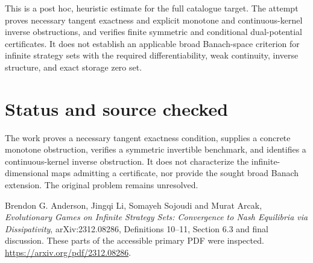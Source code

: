 \documentclass[11pt]{article}
\begin{document}
This is a post hoc, heuristic estimate for the full catalogue target.
The attempt proves necessary tangent exactness and explicit monotone and continuous-kernel inverse obstructions, and verifies finite symmetric and conditional dual-potential certificates. It does not establish an applicable broad Banach-space criterion for infinite strategy sets with the required differentiability, weak continuity, inverse structure, and exact storage zero set.

\section*{Status and source checked}
The work proves a necessary tangent exactness condition, supplies a concrete monotone obstruction, verifies a symmetric invertible benchmark, and identifies a continuous-kernel inverse obstruction. It does not characterize the infinite-dimensional maps admitting a certificate, nor provide the sought broad Banach extension. The original problem remains unresolved.

Brendon G. Anderson, Jingqi Li, Somayeh Sojoudi and Murat Arcak, \emph{Evolutionary Games on Infinite Strategy Sets: Convergence to Nash Equilibria via Dissipativity}, arXiv:2312.08286, Definitions 10--11, Section 6.3 and final discussion. These parts of the accessible primary PDF were inspected. \url{https://arxiv.org/pdf/2312.08286}.
\end{document}
